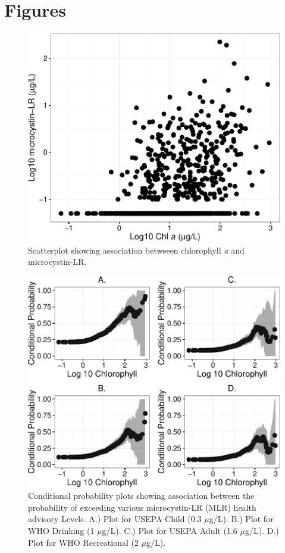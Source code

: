 \documentclass[11pt,]{article}
\begin{document}
\newpage

\section{Figures}\label{figures}

\begin{figure}[htbp]
\centering
\includegraphics{manuscript_files/figure-latex/chla_micro_scatter-1.pdf}
\caption{Scatterplot showing association betweeen chlorophyll \textit{a}
and microcystin-LR. \label{fig:chla_micro_scatter}}
\end{figure}

\newpage

\begin{figure}[htbp]
\centering
\includegraphics{manuscript_files/figure-latex/epa_child_cp_plot-1.pdf}
\caption{Conditional probability plots showing association between the
probability of exceeding various microcystin-LR (MLR) health advisory
Levels. A.) Plot for USEPA Child (0.3 \(\mu\)g/L). B.) Plot for WHO
Drinking (1 \(\mu\)g/L). C.) Plot for USEPA Adult (1.6 \(\mu\)g/L). D.)
Plot for WHO Recreational (2 \(\mu\)g/L). \label{fig:multi_cp_plot}}
\end{figure}
\end{document}
